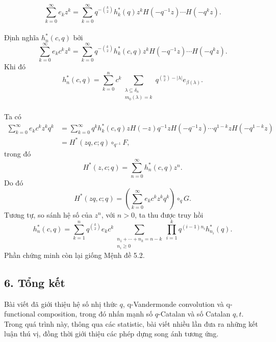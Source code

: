 \documentclass[11pt]{article}
\begin{document}

\paragraph{}
\[
  \sum_{k=0}^{\infty}e_kz^k
  =
  \sum_{k=0}^{\infty}
  q^{-\binom{k}{2}}h^*_k(q)z^k
  H(-q^{-1}z)\cdots H(-q^kz).
\]

\paragraph{}
Định nghĩa \(h^*_n(c,q)\) bởi
\[
  \sum_{k=0}^{\infty}e_kc^kz^k
  =
  \sum_{k=0}^{\infty}
  q^{-\binom{k}{2}}h^*_k(c,q)z^k
  H(-q^{-1}z)\cdots H(-q^kz).
\]
Khi đó
\[
  h^*_n(c,q)
  =
  \sum_{k=0}^{n}c^k
  \sum_{\substack{\lambda\subseteq\delta_n\\ m_0(\lambda)=k}}
  q^{\binom{n}{2}-|\lambda|}e_{\beta(\lambda)}.
\]

\paragraph{}
Ta có
\[
\begin{aligned}
  \sum_{k=0}^{\infty}e_kc^kz^kq^k
  &=
  \sum_{k=0}^{\infty}
  q^kh^*_k(c,q)zH(-z)q^{-1}zH(-q^{-1}z)\cdots q^{1-k}zH(-q^{1-k}z)\\
  &=
  H^*(zq,c;q)\circ_{q^{-1}}F,
\end{aligned}
\]
trong đó
\[
  H^*(z,c;q)=\sum_{n=0}^{\infty}h^*_n(c,q)z^n.
\]
Do đó
\[
  H^*(zq,c;q)=
  \left(\sum_{k=0}^{\infty}e_kc^kz^kq^k\right)\circ_qG.
\]
Tương tự, so sánh hệ số của \(z^n\), với \(n>0\), ta thu được truy hồi
\[
  h^*_n(c,q)
  =
  \sum_{k=1}^{n}q^{\binom{k}{2}}e_kc^k
  \sum_{\substack{n_1+\cdots+n_k=n-k\\ n_i\ge0}}
  \prod_{i=1}^{k}q^{(i-1)n_i}h^*_{n_i}(q).
\]
Phần chứng minh còn lại giống Mệnh đề 5.2.

\subsection*{6. Tổng kết}

Bài viết đã giới thiệu hệ số nhị thức \(q\), q-Vandermonde convolution và
q-functional composition, trong đó nhấn mạnh số \(q\)-Catalan và số Catalan
\(q,t\). Trong quá trình này, thông qua các statistic, bài viết nhiều lần đưa
ra những kết luận thú vị, đồng thời giới thiệu các phép dựng song ánh tương
ứng.
\end{document}
